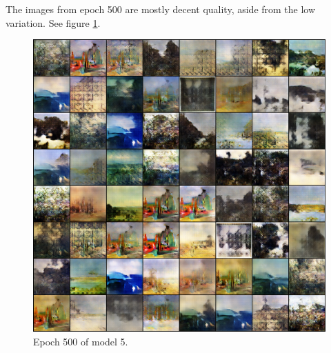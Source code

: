 \documentclass[11pt,letterpaper]{article}
\begin{document}
				The images from epoch 500 are mostly decent quality, aside from the low variation.
				See figure \ref{fig:wa128:epoch500generator}.
				\begin{figure}
					\centering
					\includegraphics[width=1.0\linewidth]{results/model5/epoch500_generator}
					\caption{Epoch 500 of model 5.}
					\label{fig:wa128:epoch500generator}
				\end{figure}
\end{document}
